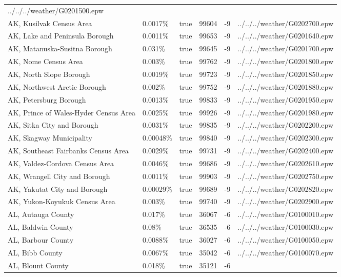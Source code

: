 \begin{longtable}[]{@{}llllll@{}}
../../../weather/G0201500.epw \\
AK, Kusilvak Census Area & 0.0017\% & true & 99604 & -9 &
../../../weather/G0202700.epw \\
AK, Lake and Peninsula Borough & 0.0011\% & true & 99653 & -9 &
../../../weather/G0201640.epw \\
AK, Matanuska-Susitna Borough & 0.031\% & true & 99645 & -9 &
../../../weather/G0201700.epw \\
AK, Nome Census Area & 0.003\% & true & 99762 & -9 &
../../../weather/G0201800.epw \\
AK, North Slope Borough & 0.0019\% & true & 99723 & -9 &
../../../weather/G0201850.epw \\
AK, Northwest Arctic Borough & 0.002\% & true & 99752 & -9 &
../../../weather/G0201880.epw \\
AK, Petersburg Borough & 0.0013\% & true & 99833 & -9 &
../../../weather/G0201950.epw \\
AK, Prince of Wales-Hyder Census Area & 0.0025\% & true & 99926 & -9 &
../../../weather/G0201980.epw \\
AK, Sitka City and Borough & 0.0031\% & true & 99835 & -9 &
../../../weather/G0202200.epw \\
AK, Skagway Municipality & 0.00048\% & true & 99840 & -9 &
../../../weather/G0202300.epw \\
AK, Southeast Fairbanks Census Area & 0.0029\% & true & 99731 & -9 &
../../../weather/G0202400.epw \\
AK, Valdez-Cordova Census Area & 0.0046\% & true & 99686 & -9 &
../../../weather/G0202610.epw \\
AK, Wrangell City and Borough & 0.0011\% & true & 99903 & -9 &
../../../weather/G0202750.epw \\
AK, Yakutat City and Borough & 0.00029\% & true & 99689 & -9 &
../../../weather/G0202820.epw \\
AK, Yukon-Koyukuk Census Area & 0.003\% & true & 99740 & -9 &
../../../weather/G0202900.epw \\
AL, Autauga County & 0.017\% & true & 36067 & -6 &
../../../weather/G0100010.epw \\
AL, Baldwin County & 0.08\% & true & 36535 & -6 &
../../../weather/G0100030.epw \\
AL, Barbour County & 0.0088\% & true & 36027 & -6 &
../../../weather/G0100050.epw \\
AL, Bibb County & 0.0067\% & true & 35042 & -6 &
../../../weather/G0100070.epw \\
AL, Blount County & 0.018\% & true & 35121 & -6 &

\end{longtable}
